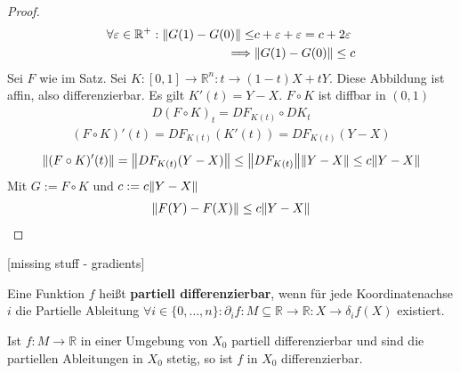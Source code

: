 \documentclass{report}
\renewcommand\epsilon{\varepsilon}
\newcommand{\tbf}[1]{\textbf{#1}}
\newcommand{\bR}{\mathbb{R}}
\begin{document}
\begin{theorem}
\begin{proof}
\begin{align*}
  \forall \epsilon \in \bR^+ : \norm{G(1) - G(0)} \leq &c + \epsilon + \epsilon = c + 2 \epsilon\\
  \implies &\norm{G(1) - G(0)} \leq c
 \end{align*}
 Sei $F$ wie im Satz. Sei $K : [0,1] \to \bR^n : t \to (1-t)X + tY$. Diese Abbildung ist affin, also differenzierbar. Es gilt $K'(t) = Y - X$. $F \circ K$ ist diffbar in $(0,1)$
 \begin{align*}
  D(F \circ K)_t = DF_{K(t)} \circ DK_t
 \end{align*}
 \begin{align*}
  (F \circ K)'(t) = DF_{K(t)}(K'(t)) = DF_{K(t)}(Y-X)
 \end{align*}
 \begin{align*}
  \norm{(F \circ K)'(t)} = \norm{DF_{K(t)}(Y - X)} \leq \norm{DF_{K(t)}}\norm{Y - X} \leq c \norm{Y - X}
 \end{align*}
 Mit $G := F \circ K$ und $c := c\norm{Y - X}$
 \begin{align*}
  \norm{F(Y) - F(X)} \leq c\norm{Y - X}
 \end{align*}

 \end{proof}
\end{theorem}
[missing stuff - gradients]
\begin{definition}
 Eine Funktion $f$ heißt \tbf{partiell differenzierbar}, wenn für jede Koordinatenachse $i$ die Partielle Ableitung $\forall i \in \{0, \hdots, n\} : \partial_i f : M \subseteq \bR \to \bR : X \to \delta_i f(X)$ existiert.
\end{definition}
\begin{theorem}
 Ist $f: M \to \bR$ in einer Umgebung von $X_0$ partiell differenzierbar und sind die partiellen Ableitungen in $X_0$ stetig, so ist $f$ in $X_0$ differenzierbar.
\end{theorem}
\end{document}
